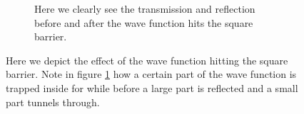 \documentclass[11pt]{article}
\begin{document}
\begin{figure}[H]
\begin{subfigure}{.9\linewidth}
		\caption{Here we clearly see the transmission and reflection before and after the wave function hits the square barrier.}
		\label{fig:squareBarrTR}
	\end{subfigure}
	\label{fig:squareBarr}
	\caption{Here we depict the effect of the wave function hitting the square barrier. Note in figure \ref{fig:squareBarrTR} how a certain part of the wave function is trapped inside for while before a large part is reflected and a small part tunnels through.}
\end{figure}
\end{document}
